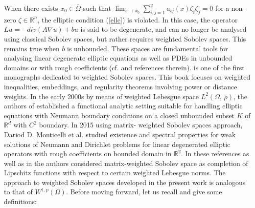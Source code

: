 \documentclass[11pt]{article}
\begin{document}
	When there {exists} $x_0\in\overline{\Omega}$ such that $\displaystyle{\lim_{x \to x_0}\sum_{i,j=1}^{2}a_{ij}(x)\zeta_i\zeta_j}=0$ for a non-zero $\zeta\in\mathbb{R}^n$, the elliptic condition (\ref{ellc}) is violated. In this case, the operator $Lu=-div(A\nabla u)+bu$ is said to be degenerate, and can no longer be analysed using classical Sobolev spaces, but rather requires weighted Sobolev spaces. This remains  true when $b$ is unbounded. These spaces are fundamental tools for analysing linear degenerate elliptic equations as well as PDEs in unbounded domains or with rough coefficients (cf. \cite{AK,BP, GU, MR} and {references therein}).  \cite{AK} is one of the first monographs dedicated to weighted Sobolev spaces. This book focuses on weighted inequalities, embeddings, and regularity theorems involving power or distance {weights}.  In the early 2000s by means of weighted Lebesgue space $L^2\left(\Omega,\, \rho\right)$,  the authors of \cite{BP} established a functional analytic setting suitable for handling elliptic equations with Neumann boundary conditions on  a closed  unbounded subset $K$ of $\mathbb{R}^d$ with $C^2$ boundary. In 2015 using matrix- weighted Sobolev spaces approach, Dariod D. Monticelli {et al.} \cite{MR} studied existence and spectral properties for weak solutions of Neumann and Dirichlet problems for linear degenerated elliptic operators with rough coefficients on bounded domain in $\mathbb{R}^2$. In these references as well as in \cite{SW, RM, DSKS} the authors considered matrix-weighted Sobolev space as completion of Lipschitz functions with respect to certain weighted Lebesgue norms. The approach to weighted Sobolev spaces developed in the present work is analogous to that of $W^{1,p}(\Omega)$. Before moving forward, let us recall and give some definitions:\\
	
\end{document}
